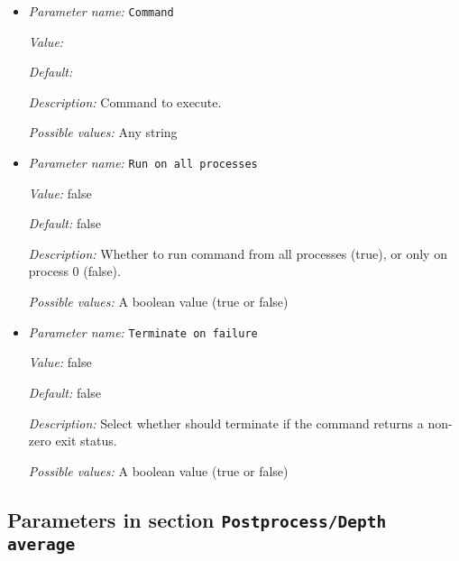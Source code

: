 \begin{itemize}
\item {\it Parameter name:} {\tt Command}
\label{parameters:Postprocess/Command/Command}


{\it Value:} 


{\it Default:} 


{\it Description:} Command to execute.


{\it Possible values:} Any string
\item {\it Parameter name:} {\tt Run on all processes}
\label{parameters:Postprocess/Command/Run on all processes}


{\it Value:} false


{\it Default:} false


{\it Description:} Whether to run command from all processes (true), or only on process 0 (false).


{\it Possible values:} A boolean value (true or false)
\item {\it Parameter name:} {\tt Terminate on failure}
\label{parameters:Postprocess/Command/Terminate on failure}


{\it Value:} false


{\it Default:} false


{\it Description:} Select whether \aspect{} should terminate if the command returns a non-zero exit status.


{\it Possible values:} A boolean value (true or false)
\end{itemize}

\subsection{Parameters in section \tt Postprocess/Depth average}
\label{parameters:Postprocess/Depth_20average}


